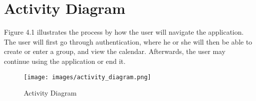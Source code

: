 \chapter{Activity Diagram}
Figure 4.1 illustrates the process by how the user will navigate the application. The user will first go through authentication, where he or she will then be able to create or enter a group, and view the calendar. Afterwards, the user may continue using the application or end it.

\begin{figure}[h]
	\centering
	\texttt{[image: images/activity\_diagram.png]}
	\caption{Activity Diagram}
	\label{fig:activity diagram}
\end{figure}